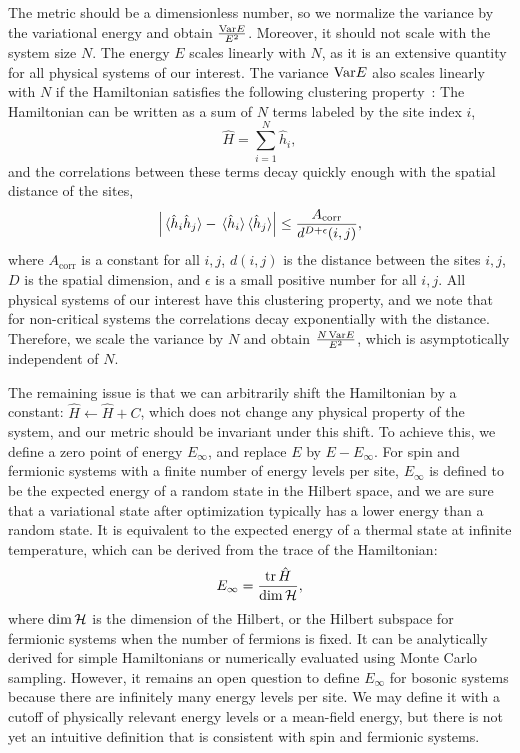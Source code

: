 The metric should be a dimensionless number, so we normalize the variance by the variational energy and obtain $\frac{\mathrm{Var} E}{E^2}$. Moreover, it should not scale with the system size $N$. The energy $E$ scales linearly with $N$, as it is an extensive quantity for all physical systems of our interest. The variance $\mathrm{Var} E$ also scales linearly with $N$ if the Hamiltonian satisfies the following clustering property~\cite{park1995uniqueness, nachtergaele2006lieb, hastings2006spectral}: The Hamiltonian can be written as a sum of $N$ terms labeled by the site index $i$,
\begin{equation}
\hat{H} = \sum_{i = 1}^N \hat{h}_i,
\end{equation}
and the correlations between these terms decay quickly enough with the spatial distance of the sites,
\begin{equation}
\left| \ev*{\hat{h}_i \hat{h}_j} - \ev*{\hat{h}_i}\!\ev*{\hat{h}_j} \right| \le \frac{A_\text{corr}}{d^{D + \epsilon}(i, j)},
\end{equation}
where $A_\text{corr}$ is a constant for all $i, j$, $d(i, j)$ is the distance between the sites $i, j$, $D$ is the spatial dimension, and $\epsilon$ is a small positive number for all $i, j$. All physical systems of our interest have this clustering property, and we note that for non-critical systems the correlations decay exponentially with the distance. Therefore, we scale the variance by $N$ and obtain $\frac{N\,\mathrm{Var} E}{E^2}$, which is asymptotically independent of $N$.

The remaining issue is that we can arbitrarily shift the Hamiltonian by a constant: $\hat{H} \gets \hat{H} + C$, which does not change any physical property of the system, and our metric should be invariant under this shift. To achieve this, we define a zero point of energy $E_\infty$, and replace $E$ by $E - E_\infty$. For spin and fermionic systems with a finite number of energy levels per site, $E_\infty$ is defined to be the expected energy of a random state in the Hilbert space, and we are sure that a variational state after optimization typically has a lower energy than a random state. It is equivalent to the expected energy of a thermal state at infinite temperature, which can be derived from the trace of the Hamiltonian:
\begin{equation}
E_\infty = \frac{\tr \hat{H}}{\dim \mathcal{H}},
\label{eq:E-infty-trace}
\end{equation}
where $\dim \mathcal{H}$ is the dimension of the Hilbert, or the Hilbert subspace for fermionic systems when the number of fermions is fixed. It can be analytically derived for simple Hamiltonians or numerically evaluated using Monte Carlo sampling. However, it remains an open question to define $E_\infty$ for bosonic systems because there are infinitely many energy levels per site. We may define it with a cutoff of physically relevant energy levels or a mean-field energy, but there is not yet an intuitive definition that is consistent with spin and fermionic systems.

